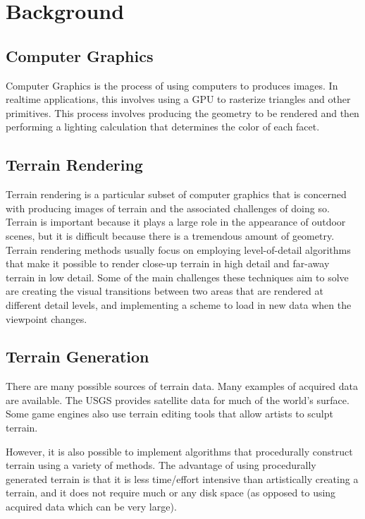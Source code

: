 
\chapter{Background}

\section{Computer Graphics}

Computer Graphics is the process of using computers to produces images.
In realtime applications, this involves using a GPU to rasterize triangles and other primitives.
This process involves producing the geometry to be rendered and then performing a lighting calculation that determines the color of each facet.

\section{Terrain Rendering}

Terrain rendering is a particular subset of computer graphics that is concerned with producing images of terrain and the associated challenges of doing so.
Terrain is important because it plays a large role in the appearance of outdoor scenes, but it is difficult because there is a tremendous amount of geometry.
Terrain rendering methods usually focus on employing level-of-detail algorithms that make it possible to render close-up terrain in high detail and far-away terrain in low detail.
Some of the main challenges these techniques aim to solve are creating the visual transitions between two areas that are rendered at different detail levels, and implementing a scheme to load in new data when the viewpoint changes.

\section{Terrain Generation}

There are many possible sources of terrain data.
Many examples of acquired data are available.
The USGS provides satellite data for much of the world's surface.
Some game engines also use terrain editing tools that allow artists to sculpt terrain.

However, it is also possible to implement algorithms that procedurally construct terrain using a variety of methods.
The advantage of using procedurally generated terrain is that it is less time/effort intensive than artistically creating a terrain, and it does not require much or any disk space (as opposed to using acquired data which can be very large).

